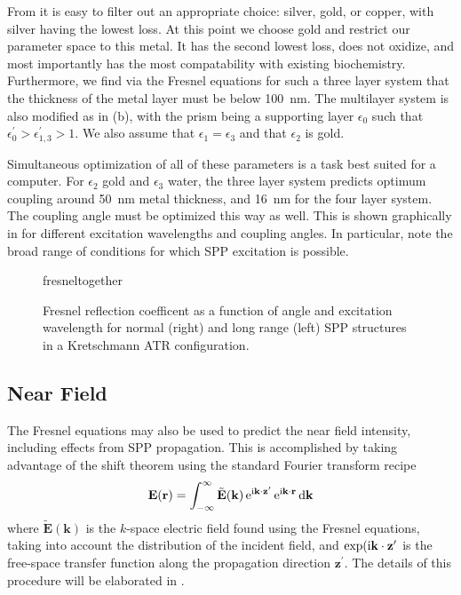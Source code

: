 From  it is easy to filter out an appropriate
choice: silver, gold, or copper, with silver having the lowest loss.  At
this point we choose gold and restrict our parameter space to this metal.
It has the second lowest loss, does not oxidize, and most importantly has
the most compatability with existing biochemistry.  Furthermore, we find
via the Fresnel equations for such a three layer system that the thickness
of the metal layer must be below \SI{100}{\nano\meter}.  The multilayer
system is also modified as in (b), with the
prism being a supporting layer $\epsilon_0$ such that
$\epsilon^\prime_0>\epsilon^\prime_{1,3}>1$.  We also assume that
$\epsilon_1=\epsilon_3$ and that $\epsilon_2$ is gold.

Simultaneous optimization of all of these parameters is a task best suited
for a computer.  For $\epsilon_2$ gold and $\epsilon_3$ water, the three
layer system predicts optimum coupling around \SI{50}{\nano\meter} metal
thickness, and \SI{16}{\nano\meter} for the four layer system.  The
coupling angle must be optimized this way as well.  This is shown
graphically in  for different excitation
wavelengths and coupling angles.  In particular, note the broad range of
conditions for which SPP excitation is possible.
\begin{figure}[ht]
\centering
{fresneltogether}
\caption{Fresnel reflection coefficent as a function of angle and
excitation wavelength for normal (right) and long range (left) SPP structures in a Kretschmann ATR 
configuration.}
\label{fig:fresnelangle}
\end{figure}

\subsection{Near Field}
The Fresnel equations may also be used to predict the near field intensity,
including effects from SPP propagation.  This is accomplished by taking
advantage of the shift theorem using the standard Fourier transform recipe
\begin{equation}
\mathbf{E}(\mathbf{r}) = \int_{-\infty}^{\infty} \tilde{\mathbf{E}}(\mathbf{k})
\,{\mathrm{e}}^{{\mathrm{i}} \mathbf{k} \cdot \mathbf{z}^\prime}
\,{\mathrm{e}}^{{\mathrm{i}} \mathbf{k} \cdot \mathbf{r}}\,\mathrm{d} \mathbf{k}
\end{equation}
where $\tilde{\mathbf{E}}(\mathbf{k})$ is the $k$-space electric field
found using the Fresnel equations, taking into account the distribution of
the incident field, and $\exp({\mathrm{i}} \mathbf{k} \cdot
\mathbf{z}^\prime$ is the free-space transfer function along the 
propagation direction $\mathbf{z}^\prime$.  The details of this procedure
will be elaborated in .  

